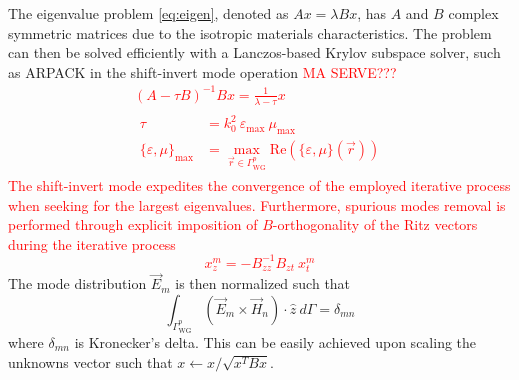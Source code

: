 \documentclass[AMA,STIX2COL]{WileyNJD-v2}
\begin{document}
The eigenvalue problem \eqref{eq:eigen}, denoted as $A x = \lambda B x$, has $A$ and $B$ complex symmetric matrices due to the isotropic materials characteristics. The problem can then be solved efficiently with a Lanczos-based Krylov subspace solver, such as ARPACK in the shift-invert mode operation \cite{Farle2004}
%
\textcolor{red}{MA SERVE???
\begin{gather}
\left( A-\tau B \right)^{-1} B x =  \frac{1}{\lambda-\tau} x\\
\begin{aligned}
\tau &= k_0^2 \ \varepsilon_\text{max} \ \mu_\text{max} \\
\{\varepsilon,\mu\}_\text{max} &= \max\limits_{\vec{r}\in\Gamma_\text{WG}^p} \text{Re}\left( \{\varepsilon,\mu\}(\vec{r}) \right) 
\end{aligned} \nonumber
\end{gather}
%
\noindent The shift-invert mode expedites the convergence of the employed iterative process when seeking for the largest eigenvalues. Furthermore, spurious modes removal is performed through explicit imposition of $B$-orthogonality of the Ritz vectors during the iterative process
%
\begin{equation}
x_z^m  = - B_{zz}^{-1} B_{zt} \ x_t^m
\end{equation}}
%
The mode distribution $\vec{E}_m$ is then normalized such that
%
\begin{equation}
\label{eq:pow}
\int_{\Gamma_\text{WG}^{p}} \left( \vec{E}_{m}  \times  \vec{H}_n \right) \cdot \hat{z} \ d\Gamma = \delta_{mn}
\end{equation}
%
\noindent where $\delta_{mn}$ is Kronecker's delta. This can be easily achieved upon scaling the unknowns vector such that $x\leftarrow{x}/{\sqrt{ x^T B x}}$.
\end{document}
